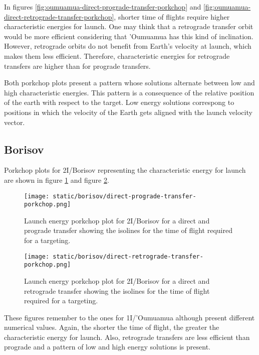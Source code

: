 In figures \ref{fig:oumuamua-direct-prograde-transfer-porkchop} and
\ref{fig:oumuamua-direct-retrograde-transfer-porkchop}, shorter time of flights
require higher characteristic energies for launch. One may think that a
retrograde transfer orbit would be more efficient considering that 'Oumuamua has
this kind of inclination. However, retrograde orbits do not benefit from Earth's
velocity at launch, which makes them less efficient. Therefore, characteristic
energies for retrograde transfers are higher than for prograde transfers.

Both porkchop plots present a pattern whose solutions alternate between low and
high characteristic energies. This pattern is a consequence of the relative
position of the earth with respect to the target. Low energy solutions
correspong to positions in which the velocity of the Earth gets aligned with the
launch velocity vector.

\subsection{Borisov}

Porkchop plots for 2I/Borisov representing the characteristic energy for launch
are shown in figure \ref{fig:borisov-direct-prograde-transfer-porkchop} and
figure \ref{fig:borisov-direct-retrograde-transfer-porkchop}.

\begin{figure}[H]
  \centering
  \texttt{[image: static/borisov/direct-prograde-transfer-porkchop.png]}
        \caption[Direct and prograde launch energy porkchop for
        2I/Borisov]{Launch energy porkchop plot for 2I/Borisov for a direct and prograde
        transfer showing the isolines for
        the time of flight required for a targeting.}
  \label{fig:borisov-direct-prograde-transfer-porkchop}
\end{figure}

\begin{figure}[H]
  \centering
  \texttt{[image: static/borisov/direct-retrograde-transfer-porkchop.png]}
        \caption[Direct and retrograde launch energy porkchop for
        2I/Borisov]{Launch energy porkchop plot for 2I/Borisov for a direct and
        retrograde transfer showing the isolines for
        the time of flight required for a targeting.}
  \label{fig:borisov-direct-retrograde-transfer-porkchop}
\end{figure}

These figures remember to the ones for 1I/'Oumuamua although present different
numerical values. Again, the shorter the time of flight, the greater the
characteristic energy for launch. Also, retrograde transfers are less efficient
than prograde and a pattern of low and high energy solutions is present.


